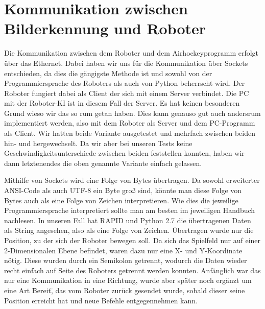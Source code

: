 
\chapter{Kommunikation zwischen Bilderkennung und Roboter}
\label{cha:Kommunikation zwischen Bilderkennung und Roboter}
Die Kommunikation zwischen dem Roboter und dem Airhockeyprogramm erfolgt über das Ethernet. Dabei haben wir uns für die Kommunikation über Sockets entschieden, da dies die gängigste Methode ist und sowohl von der Programmiersprache des Roboters als auch von Python beherrscht wird. Der Roboter fungiert dabei als Client der sich mit einem Server verbindet. Die PC mit der Roboter-KI ist in diesem Fall der Server. Es hat keinen besonderen Grund wieso wir das so rum getan haben. Dies kann genauso gut auch andersrum implementiert werden, also mit dem Roboter als Server und dem PC-Programm als Client. Wir hatten beide Variante ausgetestet und mehrfach zwischen beiden hin- und hergewechselt. Da wir aber bei unseren Tests keine Geschwindigkeitsunterschiede zwischen beiden feststellen konnten, haben wir dann letztenendes die oben genannte Variante einfach gelassen.

Mithilfe von Sockets wird eine Folge von Bytes übertragen. Da sowohl erweiterter ANSI-Code als auch UTF-8 ein Byte groß sind, könnte man diese Folge von Bytes auch als eine Folge von Zeichen interpretieren. Wie dies die jeweilige Programmiersprache interpretiert sollte man am besten im jeweiligen Handbuch nachlesen. In unseren Fall hat RAPID und Python 2.7 die übertragenen Daten als String angesehen, also als eine Folge von Zeichen. 
Übertragen wurde nur die Position, zu der sich der Roboter bewegen soll.  Da sich das Spielfeld nur auf einer 2-Dimensionalen Ebene befindet, waren dazu nur eine X- und Y-Koordinate nötig. Diese wurden durch ein Semikolon getrennt, wodurch die Daten wieder recht einfach auf Seite des Roboters getrennt werden konnten. Anfänglich war das nur eine Kommunikation in eine Richtung, wurde aber später noch ergänzt um eine Art \"Bereit\", das vom Roboter zurück gesendet wurde, sobald dieser seine Position erreicht hat und neue Befehle entgegennehmen kann. 